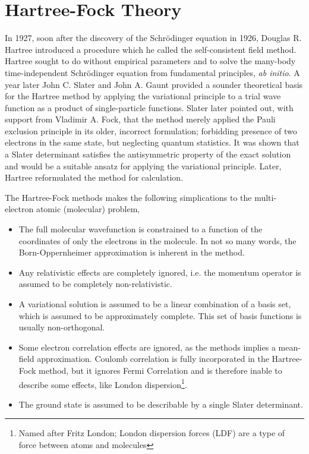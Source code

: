 \chapter{Hartree-Fock Theory} 
    \label{ch:hartree_fock}

    In 1927, soon after the discovery of the Schrödinger equation in 1926, Douglas R.
    Hartree introduced a procedure which he called the self-consistent field 
    method\cite{hartree1928wave}. 
    Hartree sought to do without empirical parameters and
    to solve the many-body time-independent Schrödinger equation from fundamental
    principles, \emph{ab initio}. A year later John C. Slater and John A. Gaunt 
    provided a sounder theoretical basis for the Hartree method by applying the 
    variational principle to a trial wave function as a product of single-particle
    functions\cite{slater1928self}\cite{gaunt1928theory}. 
    Slater later pointed out, with support from Vladimir A. Fock, that the method
    merely applied the Pauli exclusion principle in its older, incorrect formulation;
    forbidding presence of two electrons in the same state, but neglecting 
    quantum statistics\cite{slater1930note}\cite{fock1930naherungsmethode}. It was
    shown that a Slater determinant satisfies the antisymmetric property of the
    exact solution and would be a suitable ansatz for applying the variational
    principle. Later, Hartree reformulated the method for 
    calculation\cite{hartree1935self}.

    The Hartree-Fock methods makes the following simplications to the multi-electron 
    atomic (molecular) problem,
    \begin{itemize}
        \item The full molecular wavefunction is constrained to a function of the
            coordinates of only the electrons in the molecule. In not so many words,
            the Born-Oppernheimer approximation is inherent in the method.
        \item Any relativistic effects are completely ignored, i.e. the momentum
            operator is assumed to be completely non-relativistic.
        \item A variational solution is assumed to be a linear combination of a basis
            set, which is assumed to be approximately complete. This set of basis
            functions is usually non-orthogonal.
        \item Some electron correlation effects are ignored, as the methods implies
            a mean-field approximation. Coulomb correlation is fully incorporated 
            in the Hartree-Fock method, but it ignores Fermi Correlation and is
            therefore inable to describe some effects, like London 
            dispersion\footnote{Named after Fritz London; London dispersion
            forces (LDF) are a type of force between atoms and 
            molecules\cite{heitler1927wechselwirkung}}.
        \item The ground state is assumed to be describable by a single 
            Slater determinant. 
    \end{itemize}

